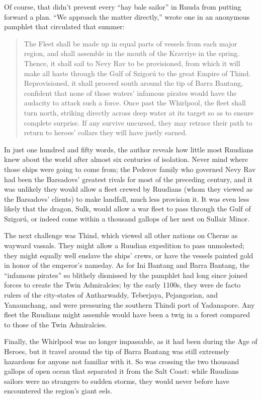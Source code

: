 \documentclass[12pt]{report}
\begin{document}
Of course, that didn't prevent every ``hay bale sailor'' in Ruuda from
putting forward a plan.  ``We approach the matter directly,'' wrote one
in an anonymous pamphlet that circulated that summer:

\begin{quotation}
The Fleet shall be made up in equal parts of vessels from each major
region, and shall assemble in the mouth of the Kravriye in the spring.
Thence, it shall sail to Nevy Rav to be provisioned, from which it
will make all haste through the Gulf of Szigor\'u to the great Empire
of Thind.  Reprovisioned, it shall proceed south around the tip of
Barra Bantang, confident that none of those waters' infamous pirates
would have the audacity to attack such a force.  Once past the
Whirlpool, the fleet shall turn north, striking directly across deep
water at its target so as to ensure complete surprise.  If any survive
uncursed, they may retrace their path to return to heroes' collars
they will have justly earned.
\end{quotation}

In just one hundred and fifty words, the author reveals how little
most Ruudians knew about the world after almost six centuries of
isolation.  Never mind where those ships were going to come from; the
Pederov family who governed Nevy Rav had been the Barsadovs' greatest
rivals for most of the preceding century, and it was unlikely they
would allow a fleet crewed by Ruudians (whom they viewed as the
Barsadovs' clients) to make landfall, much less provision it.  It was
even less likely that the dragon, Sulk, would allow a war fleet to
pass through the Gulf of Szigor\'u, or indeed come within a thousand
gallops of her nest on Sullair Minor.

The next challenge was Thind, which viewed all other nations on Cherne
as wayward vassals.  They might allow a Ruudian expedition to pass
unmolested; they might equally well enslave the ships' crews, or have
the vessels painted gold in honor of the emperor's nameday.  As for
Ini Bantang and Barra Bantang, the ``infamous pirates'' so blithely
dismissed by the pamphlet had long since joined forces to create the
Twin Admiralcies; by the early 1100s, they were de facto rulers of the
city-states of Antharwaddy, Teberjaya, Pejangorian, and Yanaunchang,
and were pressuring the southern Thindi port of Yadanapore.  Any fleet
the Ruudians might assemble would have been a twig in a forest
compared to those of the Twin Admiralcies.

Finally, the Whirlpool was no longer impassable, as it had been during
the Age of Heroes, but it travel around the tip of Barra Bantang was
still extremely hazardous for anyone not familiar with it.  So was
crossing the two thousand gallops of open ocean that separated it from
the Salt Coast: while Ruudians sailors were no strangers to sudden
storms, they would never before have encountered the region's giant
eels.
\end{document}
